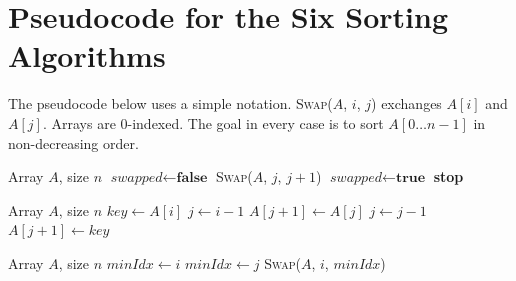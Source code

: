 \documentclass[11pt,a4paper]{article}
\begin{document}
\section{Pseudocode for the Six Sorting Algorithms}
\label{app:pseudocode}

The pseudocode below uses a simple notation. \textsc{Swap}($A$, $i$, $j$) exchanges $A[i]$ and $A[j]$. Arrays are 0-indexed. The goal in every case is to sort $A[0 \ldots n-1]$ in non-decreasing order.

\begin{algorithm}[H]
\caption{Bubble Sort}
\begin{algorithmic}[1]
\Require Array $A$, size $n$
  \State $\textit{swapped} \gets \textbf{false}$
      \State \textsc{Swap}($A$, $j$, $j+1$)
      \State $\textit{swapped} \gets \textbf{true}$
    \EndIf
  \EndFor
    \State \textbf{stop} 
  \EndIf
\EndFor
\end{algorithmic}
\end{algorithm}

\begin{algorithm}[H]
\caption{Insertion Sort}
\begin{algorithmic}[1]
\Require Array $A$, size $n$
  \State $\textit{key} \gets A[i]$
  \State $j \gets i - 1$
    \State $A[j+1] \gets A[j]$
    \State $j \gets j - 1$
  \EndWhile
  \State $A[j+1] \gets \textit{key}$
\EndFor
\end{algorithmic}
\end{algorithm}

\begin{algorithm}[H]
\caption{Selection Sort}
\begin{algorithmic}[1]
\Require Array $A$, size $n$
  \State $\textit{minIdx} \gets i$
      \State $\textit{minIdx} \gets j$
    \EndIf
  \EndFor
  \State \textsc{Swap}($A$, $i$, $\textit{minIdx}$)
\EndFor
\end{algorithmic}
\end{algorithm}
\end{document}
